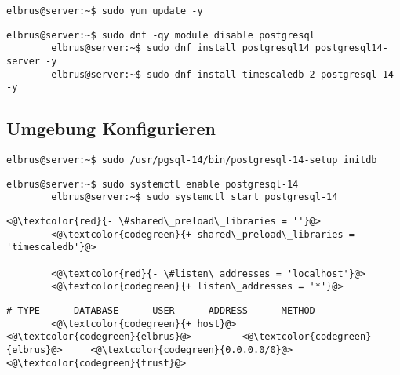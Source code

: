 \documentclass{article}
\begin{document}
	\lstset{style=commands}
	\begin{lstlisting}[caption={Updaten der lokalen Package-Liste.}]
		elbrus@server:~$ sudo yum update -y
	\end{lstlisting}

	\begin{lstlisting}[caption={Installieren von TimescaleDB.}]
		elbrus@server:~$ sudo dnf -qy module disable postgresql
		elbrus@server:~$ sudo dnf install postgresql14 postgresql14-server -y
		elbrus@server:~$ sudo dnf install timescaledb-2-postgresql-14 -y
	\end{lstlisting}
	
	\newpage
	\subsection[TimescaleDB konfigurieren]{Umgebung Konfigurieren}
	\begin{lstlisting}[caption={Initialisieren der Datenbank.}]
		elbrus@server:~$ sudo /usr/pgsql-14/bin/postgresql-14-setup initdb
	\end{lstlisting}
	
	\begin{lstlisting}[caption={Verknüpfen von 'postgresql' Serive Start mit Serverstart sowie den Service starten.}]
		elbrus@server:~$ sudo systemctl enable postgresql-14
		elbrus@server:~$ sudo systemctl start postgresql-14
	\end{lstlisting}

	\lstset{style=files}
	\begin{lstlisting}[caption={/var/lib/pgsql/14/data/postgresql.conf - Ändern der folgenden Zeilen.}, numbers=none]
		<@\textcolor{red}{- \#shared\_preload\_libraries = ''}@>
		<@\textcolor{codegreen}{+ shared\_preload\_libraries = 'timescaledb'}@>
		
		<@\textcolor{red}{- \#listen\_addresses = 'localhost'}@>
		<@\textcolor{codegreen}{+ listen\_addresses = '*'}@>
	\end{lstlisting}
	
	\begin{lstlisting}[caption={/var/lib/pgsql/14/data/pg\_hba.conf - Ändern der folgenden Zeilen.}, numbers=none]
		# TYPE      DATABASE      USER      ADDRESS      METHOD
		<@\textcolor{codegreen}{+ host}@>       <@\textcolor{codegreen}{elbrus}@>         <@\textcolor{codegreen}{elbrus}@>     <@\textcolor{codegreen}{0.0.0.0/0}@>      <@\textcolor{codegreen}{trust}@>
	\end{lstlisting}
	
\end{document}
